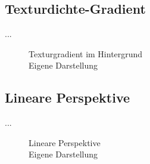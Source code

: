 \subsection{Texturdichte-Gradient}
...
\begin{figure}[!ht]
\centering
{}
\caption[Texturgradient im Hintergrund]{Texturgradient im Hintergrund\\ Eigene Darstellung}
\label{sample_texturgradient}
\end{figure}


\subsection{Lineare Perspektive}
...

\begin{figure}[!ht]
\centering
{}
\caption[Lineare Perspektive]{Lineare Perspektive\\ Eigene Darstellung}
\label{sample_lineare_perspektive}
\end{figure}

